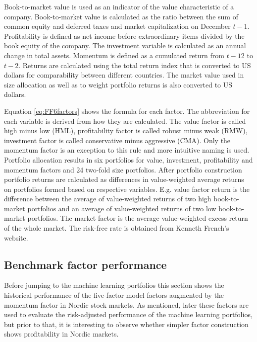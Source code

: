 \documentclass[12pt]{article}
\begin{document}
Book-to-market value is used as an indicator of the value characteristic of a company. Book-to-market value is calculated as the ratio between the sum of common equity and deferred taxes and market capitalization on December $t-1$. Profitability is defined as net income before extraordinary items divided by the book equity of the company. The investment variable is calculated as an annual change in total assets. Momentum is defined as a cumulated return from $t-12$ to $t-2$. Returns are calculated using the total return index that is converted to US dollars for comparability between different countries. The market value used in size allocation as well as to weight portfolio returns is also converted to US dollars. \par

Equation \ref{eq:FF6factors} shows the formula for each factor. The abbreviation for each variable is derived from how they are calculated. The value factor is called high minus low (HML), profitability factor is called robust minus weak (RMW), investment factor is called conservative minus aggressive (CMA). Only the momentum factor is an exception to this rule and more intuitive naming is used. Portfolio allocation results in six portfolios for value, investment, profitability and momentum factors and 24 two-fold size portfolios. After portfolio construction portfolio returns are calculated as differences in value-weighted average returns on portfolios formed based on respective variables. E.g. value factor return is the difference between the average of value-weighted returns of two high book-to-market portfolios and an average of value-weighted returns of two low book-to-market portfolios. The market factor is the average value-weighted excess return of the whole market. The risk-free rate is obtained from Kenneth French's website. \par

\subsection{Benchmark factor performance}\label{BenchmarkFactorPerformance}

Before jumping to the machine learning portfolios this section shows the historical performance of the \citet{FAMA20151} five-factor model factors augmented by the momentum factor in Nordic stock markets.\footnotemark {} As mentioned, later these factors are used to evaluate the risk-adjusted performance of the machine learning portfolios, but prior to that, it is interesting to observe whether simpler factor construction shows profitability in Nordic markets. \par
\end{document}
